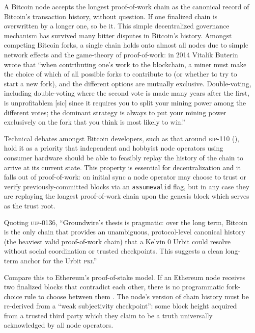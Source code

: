 \documentclass[twoside]{article}
\begin{document}
A Bitcoin node accepts the longest proof-of-work chain as the canonical
record of Bitcoin's transaction history, without question. If one
finalized chain is overwritten by a longer one, so be it. This simple
decentralized governance mechanism has survived many bitter disputes in
Bitcoin's history. Amongst competing Bitcoin forks, a single chain holds
onto almost all nodes due to simple network effects and the
game-theory of proof-of-work: in 2014 Vitalik Buterin wrote that ``when
contributing one's work to the blockchain, a miner must make the choice
of which of all possible forks to contribute to (or whether to try to
start a new fork), and the different options are mutually exclusive.
Double-voting, including double-voting where the second vote is made
many years after the first, is unprofitablem {[}sic{]} since it requires
you to split your mining power among the different votes; the dominant
strategy is always to put your mining power exclusively on the fork that
you think is most likely to win.'' \citep{Buterin2014}

Technical debates amongst Bitcoin developers, such as that around \textsc{bip}-110 (\citeyear{BIP0110}), hold it as a
priority that independent and hobbyist node operators using consumer
hardware should be able to feasibly replay the history of the chain to
arrive at its current state. This property is essential for
decentralization and it falls out of proof-of-work: on initial sync a
node operator may choose to trust or verify previously-committed blocks
via an \texttt{assumevalid} flag, but in any case they are replaying the
longest proof-of-work chain upon the genesis block which serves as the
trust root.

Quoting \textsc{uip}-0136, ``Groundwire's thesis is pragmatic: over the long
term, Bitcoin is the only chain that provides an unambiguous,
protocol-level canonical history (the heaviest valid proof-of-work
chain) that a Kelvin 0 Urbit could resolve without social coordination
or trusted checkpoints. This suggests a clean long-term anchor for the
Urbit \textsc{pki}.''

Compare this to Ethereum's proof-of-stake model. If an Ethereum node
receives two finalized blocks that contradict each other, there is no
programmatic fork-choice rule to choose between them \citep{EthereumOrgWeakSubjectivity}. The node's
version of chain history must be re-derived from a ``weak subjectivity
checkpoint'': some block height acquired from a trusted third party
which they claim to be a truth universally acknowledged by all node
operators.
\end{document}
